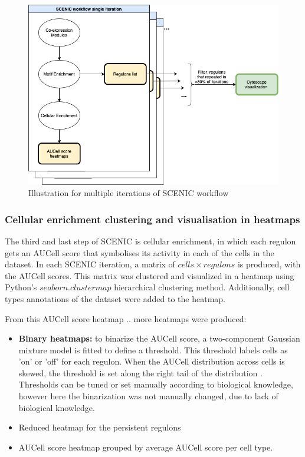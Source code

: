 \begin{figure}
    \centering
    \includegraphics[scale=0.5]{figures/methods/workflow_diagram.png}
    \caption{Illustration for multiple iterations of SCENIC workflow}
    \label{fig:workflow_diagram}
\end{figure}

\subsubsection{Cellular enrichment clustering and visualisation in heatmaps}
The third and last step of SCENIC is cellular enrichment, in which each regulon gets an AUCell score that symbolises its 
activity in each of the cells in the dataset. 
In each SCENIC iteration, a matrix of $cells \times regulons$ is produced, with the AUCell scores. 
This matrix was clustered and visualized in a heatmap using Python's $seaborn.clustermap$ hierarchical clustering method.
Additionally, cell types annotations of the dataset were added to the heatmap.

From this AUCell score heatmap .. more heatmaps were produced:

\begin{itemize}
    \item \textbf{Binary heatmaps:} to binarize the AUCell score, a two-component Gaussian mixture model is fitted to define 
        a threshold. This threshold labels cells as 'on' or 'off' for each regulon. When the AUCell distribution across cells 
        is skewed, the threshold is set along the right tail of the distribution \cite{van2020scalable}. 
        Thresholds can be tuned or set manually according to biological knowledge, however here the binarization was not 
        manually changed, due to lack of biological knowledge.
    \item Reduced heatmap for the persistent regulons
    \item AUCell score heatmap grouped by average AUCell score per cell type. 
\end{itemize}



